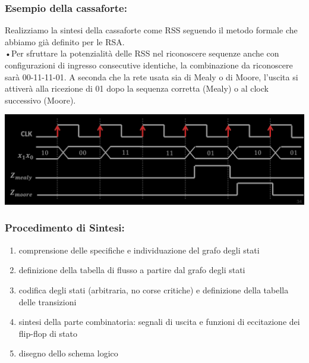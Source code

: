 \documentclass{article}
\begin{document}
\subsubsection{Esempio della cassaforte:}
Realizziamo la sintesi della cassaforte come RSS seguendo il metodo formale che abbiamo già definito per le RSA.\\
•Per sfruttare la potenzialità delle RSS nel riconoscere sequenze anche con configurazioni di ingresso consecutive identiche, la combinazione da riconoscere sarà 00-11-11-01.
A seconda che la rete usata sia di Mealy o di Moore, l’uscita si attiverà alla ricezione di 01 dopo la sequenza corretta (Mealy) o al clock successivo (Moore).
\begin{center}
    \includegraphics[scale=0.35]{cassaforte-rss.png}
\end{center}
\subsubsection{Procedimento di Sintesi:}
\begin{enumerate}
    \item comprensione delle specifiche e individuazione del grafo degli stati
    \item definizione della tabella di flusso a partire dal grafo degli stati
    \item codifica degli stati (arbitraria, no corse critiche) e definizione della tabella delle transizioni
    \item sintesi della parte combinatoria: segnali di uscita e funzioni di eccitazione dei flip-flop di stato
    \item disegno dello schema logico
\end{enumerate}
\end{document}
